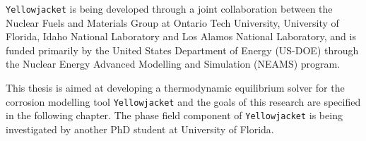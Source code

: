 	\texttt{Yellowjacket} is being developed through a joint collaboration between the Nuclear Fuels and Materials Group at Ontario Tech University, University of Florida, Idaho National Laboratory and Los Alamos National Laboratory, and is funded primarily by the United States Department of Energy (US-DOE) through the Nuclear Energy Advanced Modelling and Simulation (NEAMS) program.  
	
	This thesis is aimed at developing a thermodynamic equilibrium solver for the corrosion modelling tool \texttt{Yellowjacket} and the goals of this research are specified in the following chapter. The phase field component of \texttt{Yellowjacket} is being investigated by another PhD student at University of Florida.
	

	

